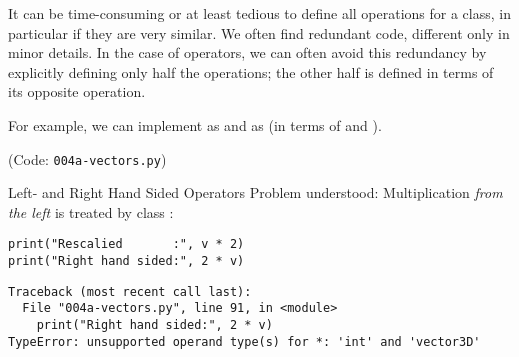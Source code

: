 
\begin{frame}
%
\begin{hintbox}
It can be time-consuming or at least tedious to define all operations for a class, in particular if they are very similar. We often find redundant code, different only in minor details. In the case of operators, we can often avoid this redundancy by explicitly defining only half the operations; the other half is defined in terms of its opposite operation.

For example, we can implement  as  and  as  (\ie in terms of  and ).
\end{hintbox}
%
\end{frame}


\begin{frame}
%
\begin{center}
	(Code: \texttt{004a-vectors.py})
\end{center}
%
\end{frame}


\begin{frame}[fragile]{Left- and Right Hand Sided Operators}
%
Problem understood: Multiplication \emph{from the left} is treated by class :
\begin{warnbox}[Example: Right Hand Sided Multiplication, leftupper=6mm]
\begin{verbatim}
print("Rescalied       :", v * 2)
print("Right hand sided:", 2 * v)
\end{verbatim}
\end{warnbox}
%
\begin{cmdbox}
\begin{verbatim}
Traceback (most recent call last):
  File "004a-vectors.py", line 91, in <module>
    print("Right hand sided:", 2 * v)
TypeError: unsupported operand type(s) for *: 'int' and 'vector3D'
\end{verbatim}
\end{cmdbox}
%
\end{frame}


